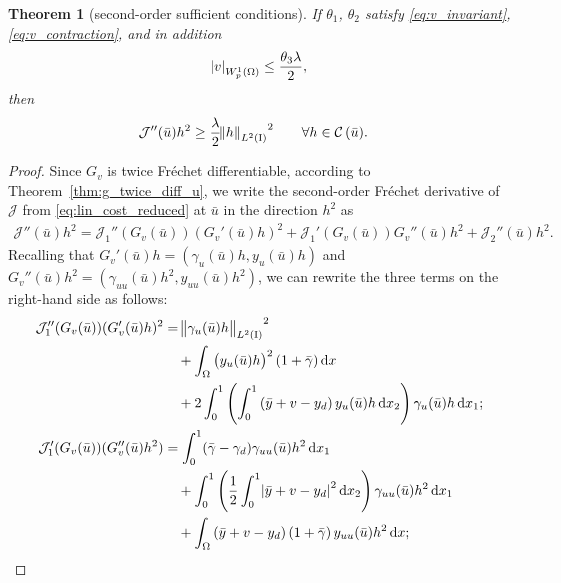 \documentclass[final]{siamltex}
\newtheorem{thm}[theorem]{Theorem}
\begin{document}
\begin{thm}[second-order sufficient conditions] \label{thm:second_order_suff}
If $\theta_1$, $\theta_2$ satisfy \eqref{eq:v_invariant}, \eqref{eq:v_contraction}, and in addition
\begin{align}\label{eq:v_second_order_suff}
     {\abs{{v}}_{{W^{{{1}}}_{{{p}}}\del{{{\Omega}}}}}} \le \frac{\theta_3 \lambda}{2} ,
\end{align}
then
\begin{align}   \label{eq:second_order_suff}
	{\mathcal{J}}''({\bar{u}}) h^2 &\ge \frac{\lambda}{2} {\norm{{h}}_{{L^2\del{{{\text{\rm I}}}}}}}^2 \qquad \forall h \in {{\mathcal C\del{{\bar{u}}}}} .
\end{align}
\end{thm}
\begin{proof}
Since $G_v$ is twice Fr\'echet differentiable, according to Theorem~\ref{thm:g_twice_diff_u},
we write the second-order Fr\'echet derivative of ${\mathcal{J}}$ from \eqref{eq:lin_cost_reduced} at ${\bar{u}}$ in the direction $h^2$ as
\begin{align*}  
{\mathcal{J}}''({\bar{u}})h^2 = {\mathcal{J}}_1''(G_v({\bar{u}})) (G_v'({\bar{u}})h)^2 
	+ {\mathcal{J}}_1'(G_v({\bar{u}}))G_v''({\bar{u}}) h^2 + {\mathcal{J}}_2''({\bar{u}}) h^2.
\end{align*}
Recalling that $G_v'({\bar{u}})h = (\gamma_u({\bar{u}})h,y_u({\bar{u}})h)$
and $G_v''({\bar{u}})h^2 = (\gamma_{uu}({\bar{u}})h^2,y_{uu}({\bar{u}})h^2)$, we can
rewrite the three terms on the right-hand side as follows:
\begin{align*}
      {\mathcal{J}}_1''(G_v ({\bar{u}}))  (G_v'({\bar{u}})h)^2  
     & = {\norm{{\gamma_u({\bar{u}})h}}_{{L^2\del{{{\text{\rm I}}}}}}}^2  \\
     &\quad + \int_\Omega \del{y_u({\bar{u}})h}^2 \del{1+{\bar{\gamma}}}  \dif x \\
     &\quad + 2 \int_0^1 \del{\int_0^1 \del{{\bar{y}}+v-y_d}
       y_u({\bar{u}})h \dif x_2 } \gamma_u({\bar{u}}) h \dif x_1 ;
     \\
     {\mathcal{J}}_1'(G_v  ({\bar{u}}))  (G_v''({\bar{u}})h^2) 
      &=  \int_0^1({\bar{\gamma}} - \gamma_d) \gamma_{uu}({\bar{u}})h^2 \dif  x_1 \\
      &\quad + \int_0^1 \del{\frac{1}{2} \int_0^1 \abs{{\bar{y}}+v-y_d}^2 \dif x_2 } 
           \gamma_{uu}({\bar{u}}) h^2 \dif x_1   \\
      &\quad +  \int_{\Omega} \del{{\bar{y}} + v - y_d} \del{1+{\bar{\gamma}}} 
           y_{uu}({\bar{u}})h^2 \dif x;  \\

\end{align*}
\end{proof}
\end{document}
